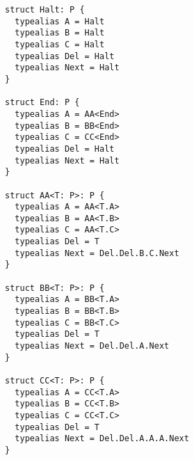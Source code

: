 \documentclass[../generics]{subfiles}
\begin{document}
\begin{listing}\label{collatz listing}
\begin{Verbatim}[fontsize=\small]
struct Halt: P {
  typealias A = Halt
  typealias B = Halt
  typealias C = Halt
  typealias Del = Halt
  typealias Next = Halt
}

struct End: P {
  typealias A = AA<End>
  typealias B = BB<End>
  typealias C = CC<End>
  typealias Del = Halt
  typealias Next = Halt
}

struct AA<T: P>: P {
  typealias A = AA<T.A>
  typealias B = AA<T.B>
  typealias C = AA<T.C>
  typealias Del = T
  typealias Next = Del.Del.B.C.Next
}

struct BB<T: P>: P {
  typealias A = BB<T.A>
  typealias B = BB<T.B>
  typealias C = BB<T.C>
  typealias Del = T
  typealias Next = Del.Del.A.Next
}

struct CC<T: P>: P {
  typealias A = CC<T.A>
  typealias B = CC<T.B>
  typealias C = CC<T.C>
  typealias Del = T
  typealias Next = Del.Del.A.A.A.Next
}
\end{Verbatim}
\end{listing}

\newcommand{\SigmaA}{\Sigma_{\nA}}
\newcommand{\SigmaB}{\Sigma_{\nB}}
\newcommand{\SigmaC}{\Sigma_{\nC}}
\newcommand{\SigmaAA}{\Sigma_{\texttt{AA}}}
\newcommand{\SigmaBB}{\Sigma_{\texttt{BB}}}
\newcommand{\SigmaCC}{\Sigma_{\texttt{CC}}}
\newcommand{\SigmaEnd}{\Sigma_{\texttt{End}}}
\newcommand{\SigmaHalt}{\Sigma_{\texttt{Halt}}}
\newcommand{\SigmaDel}{\Sigma_{\texttt{Del}}}
\newcommand{\TNext}{\texttt{$\uptau$.[P]Next}}

\newcommand{\ConfAAP}{\ConfReq{AA<$\uptau$>}{P}}
\newcommand{\ConfBBP}{\ConfReq{BB<$\uptau$>}{P}}
\newcommand{\ConfCCP}{\ConfReq{CC<$\uptau$>}{P}}
\newcommand{\ConfEndP}{\ConfReq{End}{P}}
\newcommand{\ConfHaltP}{\ConfReq{Halt}{P}}

\newcommand{\ConfTP}{\ConfReq{$\uptau$}{P}}

\newcommand{\AssocConfAP}{\AssocConf{Self.[P]A}{P}}
\newcommand{\AssocConfBP}{\AssocConf{Self.[P]B}{P}}
\newcommand{\AssocConfCP}{\AssocConf{Self.[P]C}{P}}
\newcommand{\AssocConfTP}{\AssocConf{Self.[P]T}{P}}
\end{document}
